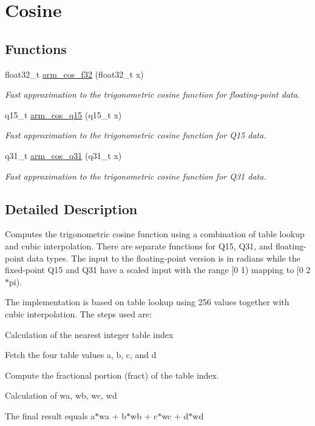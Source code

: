 \hypertarget{group__cos}{\section{Cosine}
\label{group__cos}
}
\subsection*{Functions}
\begin{DoxyCompactItemize}
\item 
float32\-\_\-t \hyperlink{group__cos_gace15287f9c64b9b4084d1c797d4c49d8}{arm\-\_\-cos\-\_\-f32} (float32\-\_\-t x)
\begin{DoxyCompactList}\small\item\em Fast approximation to the trigonometric cosine function for floating-\/point data. \end{DoxyCompactList}\item 
q15\-\_\-t \hyperlink{group__cos_gadfd60c24def501638c0d5db20f4c869b}{arm\-\_\-cos\-\_\-q15} (q15\-\_\-t x)
\begin{DoxyCompactList}\small\item\em Fast approximation to the trigonometric cosine function for Q15 data. \end{DoxyCompactList}\item 
q31\-\_\-t \hyperlink{group__cos_gad80f121949ef885a77d83ab36e002567}{arm\-\_\-cos\-\_\-q31} (q31\-\_\-t x)
\begin{DoxyCompactList}\small\item\em Fast approximation to the trigonometric cosine function for Q31 data. \end{DoxyCompactList}\end{DoxyCompactItemize}


\subsection{Detailed Description}
Computes the trigonometric cosine function using a combination of table lookup and cubic interpolation. There are separate functions for Q15, Q31, and floating-\/point data types. The input to the floating-\/point version is in radians while the fixed-\/point Q15 and Q31 have a scaled input with the range \mbox{[}0 1) mapping to \mbox{[}0 2$\ast$pi).

The implementation is based on table lookup using 256 values together with cubic interpolation. The steps used are\-:
\begin{DoxyEnumerate}
\item Calculation of the nearest integer table index
\item Fetch the four table values a, b, c, and d
\item Compute the fractional portion (fract) of the table index.
\item Calculation of wa, wb, wc, wd
\item The final result equals {\ttfamily a$\ast$wa + b$\ast$wb + c$\ast$wc + d$\ast$wd}
\end{DoxyEnumerate}

